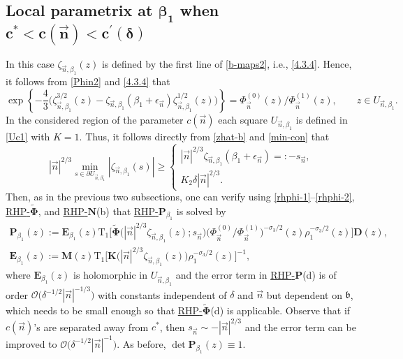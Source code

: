 \documentclass[10pt,a4paper]{amsart}
\numberwithin{equation}{section}
\renewcommand{\det}{\operatorname{det}}
\newcommand{\n}{{\vec n}}
\newcommand{\rhn} {\textnormal{RHP}-${\boldsymbol N}$}
\newcommand{\rhp} {\textnormal{RHP}-${\boldsymbol P}$}
\newcommand{\rhwphi} {\textnormal{RHP}-${\widetilde{\boldsymbol \Phi}}$}
\begin{document}
\subsection[Local parametrix at beta\_1 when c\^* < c(n) < c\^prime(delta)]{Local parametrix at $\boldsymbol{\beta_1} $ when $ \boldsymbol{c^* < c(\n) < c^\prime(\delta) }$}


In this case $ \zeta_{\n,\beta_1}(z) $ is defined by the first line of \eqref{b-maps2}, i.e., \eqref{4.3.4}. Hence, it follows from \eqref{Phin2} and \eqref{4.3.4} that
\begin{equation}
\label{rhphi-1}
\exp\left\{ -\frac43 \bigl( \zeta_{\n,\beta_1}^{3/2}(z) - \zeta_{\n,\beta_1}(\beta_1+\epsilon_\n) \zeta_{\n,\beta_1}^{1/2}(z) \bigr) \right\} = \Phi_{\n}^{(0)}(z)/\Phi_{\n}^{(1)}(z), \qquad z\in U_{\n,\beta_1}.
\end{equation}
In the considered region of the parameter $ c(\n) $ each square $ U_{\n,\beta_1} $ is defined in \eqref{Uc1} with $ K=1 $. Thus, it follows directly from \eqref{zhat-b} and \eqref{min-con} that
\begin{equation}
\label{rhphi-2}
|\n|^{2/3}\min_{s\in\partial U_{\n,\beta_1}}|\zeta_{\n,\beta_1}(s)| \geq
\begin{cases}
|\n|^{2/3}\zeta_{\n,\beta_1}(\beta_1+\epsilon_\n) =: -s_\n, \\
K_2 \delta|\n|^{2/3}.
\end{cases}
\end{equation}
Then, as in the previous two subsections, one can verify using \eqref{rhphi-1}--\eqref{rhphi-2}, \hyperref[rhwphi]{\rhwphi}, and \hyperref[rhn]{\rhn}(b) that \hyperref[rhp]{\rhp$_{\beta_1}$} is solved by
\begin{gather*}%
\boldsymbol P_{\beta_1}(z) := \boldsymbol E_{\beta_1}(z) \mathrm{T}_1\big[ \widetilde{\boldsymbol\Phi} \bigl(|\n|^{2/3}\zeta_{\n,\beta_1}(z);s_\n\bigr) \bigl(\Phi^{(0)}_\n/\Phi^{(1)}_\n\bigr)^{-\sigma_3/2}(z)\rho_1^{-\sigma_3/2}(z) \big] \boldsymbol D(z), \\
\boldsymbol E_{\beta_1}(z) := \boldsymbol M(z)\mathrm{T}_1\big[ \boldsymbol K \bigl(|\n|^{2/3}\zeta_{\n,\beta_1}(z)\bigr) \rho_1^{-\sigma_3/2}(z)\big]^{-1},
\end{gather*}
where $\boldsymbol E_{\beta_1}\!(z)$ is holomorphic in $ U_{\n,\beta_1} $ and the error term in \hyperref[rhp]{\rhp}(d) is of order $ \boldsymbol{\mathcal O}\bigl(\delta^{-1/2} |\n|^{-1/3} \bigr) $ with constants independent of $ \delta $ and $ \n $ but dependent on $ \mathfrak b $, which needs to be small enough so that \hyperref[rhwphi]{\rhwphi}(d) is applicable. Observe that if $ c(\n) $'s are separated away from $ c^* $, then $ s_\n \sim -|\n|^{2/3} $ and the error term can be improved to $ \boldsymbol{\mathcal O}\bigl(\delta^{-1/2} |\n|^{-1} \bigr) $. As before, $ \det \boldsymbol P_{\beta_1}(z) \equiv 1 $.
\end{document}
